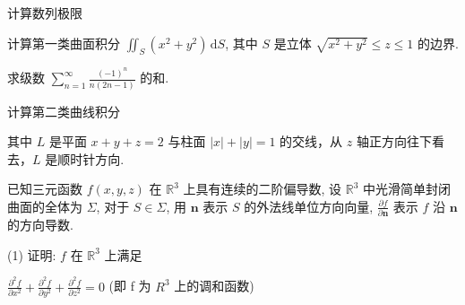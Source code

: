 \par{}
\par{}
计算数列极限\par
\nopagebreak[4]
\par{}
计算第一类曲面积分 $\iint_{S} (x^{2} + y^{2}) \, \mathrm{d}S$, 其中 $S$ 是立体 $\sqrt{x^2 + y^2} \leq z \leq 1$ 的边界.\par
\par{}
求级数 $\sum_{n=1}^{\infty} \frac{(-1)^n}{n(2n-1)}$ 的和.\par
\par{}
\par{}
计算第二类曲线积分\par
\nopagebreak[4]
其中 $L$ 是平面 $x + y + z = 2$ 与柱面 $|x| + |y| = 1$ 的交线，从 $z$ 轴正方向往下看去，$L$ 是顺时针方向.\par
\par{}
已知三元函数 $f(x, y, z)$ 在 $\mathbb{R}^3$ 上具有连续的二阶偏导数, 设 $\mathbb{R}^3$ 中光滑简单封闭曲面的全体为 $\Sigma$, 对于 $S \in \Sigma$, 用 $\pmb{n}$ 表示 $S$ 的外法线单位方向向量, $\frac{\partial f}{\partial \pmb{n}}$ 表示 $f$ 沿 $\pmb{n}$ 的方向导数.\par
(1) 证明: $f$ 在 $\mathbb{R}^3$ 上满足\par
$\frac{\partial^{2}f}{\partial x^{2}}+\frac{\partial^{2}f}{\partial y^{2}}+\frac{\partial^{2}f}{\partial z^{2}}=0$  (即 f 为  $R^{3}$  上的调和函数)\par
